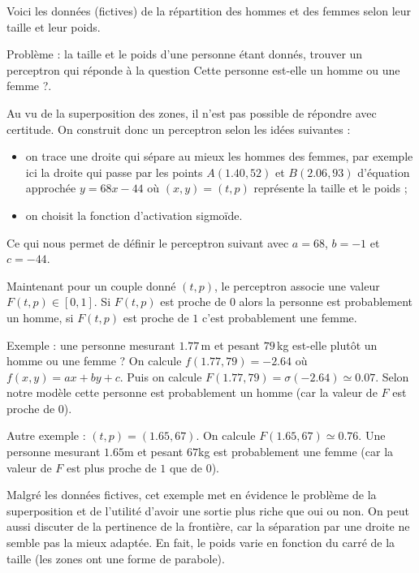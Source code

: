 \documentclass[11pt,class=report,crop=false]{standalone}
\begin{document}
\begin{exemple}
Voici les données (fictives) de la répartition des hommes et des femmes selon leur taille et leur poids.
  


Problème : la taille et le poids d'une personne étant donnés, trouver un perceptron qui réponde à la question \og{}Cette personne est-elle un homme ou une femme ?\fg{}.

Au vu de la superposition des zones, il n'est pas possible de répondre avec certitude.  On construit donc un perceptron selon les idées suivantes :
\begin{itemize}
  \item on trace une droite qui sépare au mieux les hommes des femmes, par exemple ici la droite qui passe par les points $A(1.40,52)$ et $B(2.06,93)$ d'équation approchée $y=68x-44$ où $(x,y)=(t,p)$ représente la taille et le poids ;

  \item on choisit la fonction d'activation sigmoïde.
\end{itemize}
Ce qui nous permet de définir le perceptron suivant avec $a=68$, $b=-1$ et $c=-44$.

\begin{center}
\begin{minipage}{0.35\textwidth}
\end{minipage}
\begin{minipage}{0.45\textwidth}
\end{minipage}
\end{center}

Maintenant pour un couple donné $(t,p)$, le perceptron associe une valeur $F(t,p) \in [0,1]$.
Si $F(t,p)$ est proche de $0$ alors la personne est probablement un homme, si $F(t,p)$ est proche de $1$ c'est probablement une femme.


Exemple : une personne mesurant $1.77$\,m et pesant $79$\,kg est-elle plutôt un homme ou une femme ? On calcule $f(1.77,79)=-2.64$ où $f(x,y)=ax+by+c$.
Puis on calcule $F(1.77,79) = \sigma(-2.64) \simeq 0.07$. Selon notre modèle cette personne est probablement un homme (car la valeur de $F$ est proche de $0$).

Autre exemple : $(t,p)=(1.65,67)$. On calcule $F(1.65,67) \simeq 0.76$.
Une personne mesurant $1.65$m et pesant $67$kg est probablement une femme (car la valeur de $F$ est plus proche de $1$ que de $0$).

Malgré les données fictives, cet exemple met en évidence le problème de la superposition et de l'utilité d'avoir une sortie plus riche que  \og{}oui\fg{} ou \og{}non\fg{}. On peut aussi discuter de la pertinence de la frontière, car la séparation par une droite ne semble pas la mieux adaptée.  En fait, le poids varie en fonction du carré de la taille (les zones ont une forme de parabole). 
\end{exemple}
\end{document}
